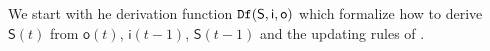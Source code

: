 




We start with he derivation function ${\tt Df}( \mathsf{S},  \mathsf{i},  \mathsf{o})$ which formalize how to derive $\mathsf{S}(t)$ from $\mathsf{o}(t)$, $\mathsf{i}(t-1)$, $\mathsf{S}(t-1)$ and the updating rules of \BCN.  %

